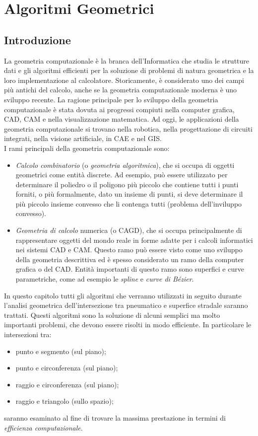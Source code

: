 \chapter{Algoritmi Geometrici}
\label{Geom_Algos}
%
\section{Introduzione}
La geometria computazionale è la branca dell'Informatica che studia le strutture dati e gli algoritmi efficienti per la soluzione di problemi di natura geometrica e la loro implementazione al calcolatore. Storicamente, è considerato uno dei campi più antichi del calcolo, anche se la geometria computazionale moderna è uno sviluppo recente. La ragione principale per lo sviluppo della geometria computazionale è stata dovuta ai progressi compiuti nella computer grafica, \ac{CAD}, \ac{CAM} e nella visualizzazione matematica. Ad oggi, le applicazioni della geometria computazionale si trovano nella robotica, nella progettazione di circuiti integrati, nella visione artificiale, in \ac{CAE} e nel \ac{GIS}.\\
I rami principali della geometria computazionale sono:
\begin{itemize}
	\item \textit{Calcolo combinatorio} (o \textit{geometria algoritmica}), che si occupa di oggetti geometrici come entità discrete. Ad esempio, può essere utilizzato per determinare il poliedro o il poligono più piccolo che contiene tutti i punti forniti, o più formalmente, dato un insieme di punti, si deve determinare il più piccolo insieme convesso che li contenga tutti (problema dell'inviluppo convesso).
	\item \textit{Geometria di calcolo} numerica (o \ac{CAGD}), che si occupa principalmente di rappresentare oggetti del mondo reale in forme adatte per i calcoli informatici nei sistemi \ac{CAD} e \ac{CAM}. Questo ramo può essere visto come uno sviluppo della geometria descrittiva ed è spesso considerato un ramo della computer grafica o del \ac{CAD}. Entità importanti di questo ramo sono superfici e curve parametriche, come ad esempio le \textit{spline} e \textit{curve di Bézier}.
\end{itemize}
In questo capitolo tutti gli algoritmi che verranno utilizzati in seguito durante l'analisi geometrica dell'intersezione tra pneumatico e superfice stradale saranno trattati. Questi algoritmi sono la soluzione di alcuni semplici ma molto importanti problemi, che devono essere risolti in modo efficiente. In particolare le intersezioni tra:
\begin{itemize}
	\item punto e segmento (sul piano);
	\item punto e circonferenza (sul piano);
	\item raggio e circonferenza (sul piano);
	\item raggio e triangolo (sullo spazio);
\end{itemize}
saranno esaminato al fine di trovare la massima prestazione in termini di \textit{efficienza computazionale}.
%
